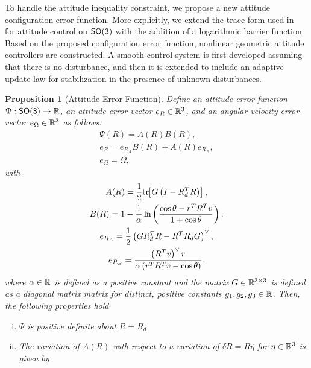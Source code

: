 \documentclass[letterpaper, 10 pt, conference]{ieeeconf}  %
\newtheorem{prop}{Proposition}
\begin{document}
To handle the attitude inequality constraint, we propose a new attitude configuration error function. 
More explicitly, we extend the trace form used in~\cite{bullo2004,LeeITCST13} for attitude control on \(\mathsf{SO(3)}\) with the addition of a logarithmic barrier function. 
Based on the proposed configuration error function,  nonlinear geometric attitude controllers are constructed. 
A smooth control system is first developed assuming that there is  no disturbance, and then it is extended to include an adaptive update law for stabilization in the presence of unknown disturbances. 

\begin{prop}[Attitude Error Function] \label{prop:config_error}
Define an attitude error function \( \Psi : \mathsf{SO(3)} \to \mathbb{R} \), an attitude error vector \( e_R \in \mathbb{R}^3 \), and an angular velocity error vector \( e_\Omega \in \mathbb{R}^3 \) as follows:
\begin{gather}
	\Psi(R) = A(R) B(R) , \label{eqn:psi} \\
	e_R = e_{R_A} B(R) + A(R) e_{R_B} , \label{eqn:eR} \\
	e_\Omega = \Omega , \label{eqn:eW}
\end{gather}
with
\begin{gather}
	A(R) = \frac{1}{2} \mathrm{tr}\negthickspace\left[ G \left( I - R_d^T R\right) \right] , \label{eqn:A} \\
	B(R) = 1 - \frac{1}{\alpha} \ln \left( \frac{\cos \theta -  r^T R^T v}{1 + \cos \theta}\right) . \label{eqn:B} \\
	e_{R_A} = \frac{1}{2} \left( G R_d^T R - R^T R_d G \right) ^ \vee , \label{eqn:eRA} \\
	e_{R_B} = \frac{ \left( R^T v\right)^\vee r}{\alpha \left(r^T R^T v - \cos \theta \right)} . \label{eqn:eRB} 
\end{gather}	
where \( \alpha \in \mathbb{R} \) is defined as a positive constant and the matrix \( G \in \mathbb{R}^{3 \times 3} \) is defined as a diagonal matrix matrix for distinct, positive constants \( g_1, g_2, g_3 \in \mathbb{R} \).
Then, the following properties hold
\begin{enumerate}[(i)]
	\item \label{item:prop_psi_psd} \(\Psi\) is positive definite about \( R = R_d\)
	\item \label{item:prop_era}The variation of \( A(R) \) with respect to a variation of \( \delta R = R \hat{\eta} \) for \( \eta \in \mathbb{R}^3 \) is given by

\end{enumerate}
\end{prop}
\end{document}
